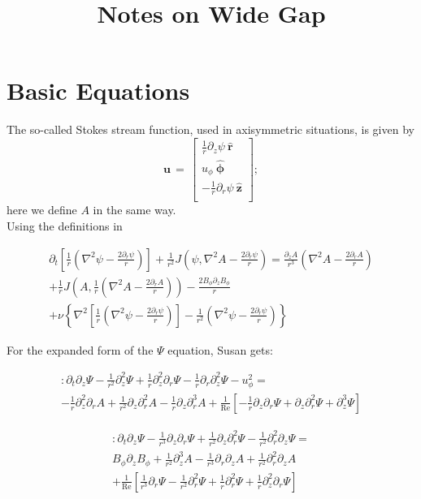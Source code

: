 \documentclass{paper}
\newcommand{\uphi}{\ensuremath{u_\phi}}
\newcommand{\rhat}{\ensuremath{\mathbf{\hat{r}}}}
\newcommand{\phihat}{\ensuremath{\mathbf{\hat{\phi}}}}
\newcommand{\zhat}{\ensuremath{\mathbf{\hat{z}}}}
\newcommand\reye{\mathrm{Re}}
\begin{document}
\title{Notes on Wide Gap}

\section{Basic Equations}
\label{sec:equations}
The so-called Stokes stream function, used in axisymmetric situations, is given by 
\begin{equation}
  \label{eq:stokes}
  \mathbf{u} \, = \, \left[\begin{matrix}
\frac{1}{r} \partial_z \psi\ \rhat\\
\uphi \ \phihat\\
-\frac{1}{r} \partial_r \psi\ \zhat\\
\end{matrix}\right];
\end{equation}
here we define $A$ in the same way. \\

Using the definitions in 

\begin{multline}
  \label{eq:psi}
\partial_t \left[ \frac{1}{r} \left(\nabla^2 \psi - \frac{2 \partial_r \psi}{r} \right) \right] + \frac{1}{r^2} J(\psi, \nabla^2 A - \frac{2 \partial_r \psi}{r}) = \frac{\partial_z A}{r^3} \left( \nabla^2 A - \frac{2 \partial_r A}{r}\right) \\
+ \frac{1}{r} J\left(A,\frac{1}{r}\left( \nabla^2 A - \frac{2 \partial_r A}{r}\right)\right) - \frac{2 B_\phi \partial_z B_\phi}{r}\\
+ \nu \left\{ \nabla^2 \left[ \frac{1}{r} \left(\nabla^2 \psi - \frac{2 \partial_r \psi}{r}\right) \right]  -\frac{1}{r^2} \left(\nabla^2 \psi - \frac{2 \partial_r \psi}{r}\right) \right\}
\end{multline}

For the expanded form of the $\Psi$ equation, Susan gets:

\begin{multline}
[\rhat]: \partial_t \partial_z \Psi - \frac{1}{r^2} \partial_z^2 \Psi + \frac{1}{r}\partial_z^2\partial_r \Psi - \frac{1}{r}\partial_r\partial_z^2 \Psi - u_\phi^2 = \\
-\frac{1}{r} \partial_z^2\partial_r A + \frac{1}{r^2} \partial_z\partial_r^2 A - \frac{1}{r}\partial_z\partial_r^3 A + \frac{1}{\reye} \left[ - \frac{1}{r}\partial_z\partial_r \Psi + \partial_z\partial_r^2 \Psi + \partial_z^3 \Psi \right]
\end{multline}

\begin{multline}
[\zhat]: \partial_t \partial_z \Psi - \frac{1}{r^3}\partial_z\partial_r \Psi + \frac{1}{r^2}\partial_z \partial_r^2 \Psi - \frac{1}{r^2}\partial_r^2\partial_z\Psi = \\
B_\phi \partial_z B_\phi + \frac{1}{r^2}\partial_z^3A - \frac{1}{r^3}\partial_r\partial_zA + \frac{1}{r^2} \partial_r^2 \partial_z A \\+ \frac{1}{\reye} \left[ \frac{1}{r^3}\partial_r \Psi - \frac{1}{r^2} \partial_r^2 \Psi
+\frac{1}{r}\partial_r^2 \Psi + \frac{1}{r}\partial_z^2\partial_r\Psi \right]
\end{multline}
\end{document}
